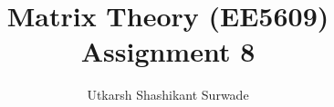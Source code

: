\documentclass[journal,12pt,twocolumn]{IEEEtran}
\begin{document}
\makeatletter
{}
\makeatother
\let\StandardTheFigure\thefigure
\let\vec\mathbf
\renewcommand{\thefigure}{\theproblem}
\def\putbox#1#2#3{\makebox[0in][l]{\makebox[#1][l]{}\raisebox{\baselineskip}[0in][0in]{\raisebox{#2}[0in][0in]{#3}}}}
     \def\rightbox#1{\makebox[0in][r]{#1}}
     \def\centbox#1{\makebox[0in]{#1}}
     \def\topbox#1{\raisebox{-\baselineskip}[0in][0in]{#1}}
     \def\midbox#1{\raisebox{-0.5\baselineskip}[0in][0in]{#1}}
\vspace{3cm}
\title{Matrix Theory (EE5609) Assignment 8}
\author{Utkarsh Shashikant Surwade}
%
%
%
% 
%
\end{document}
